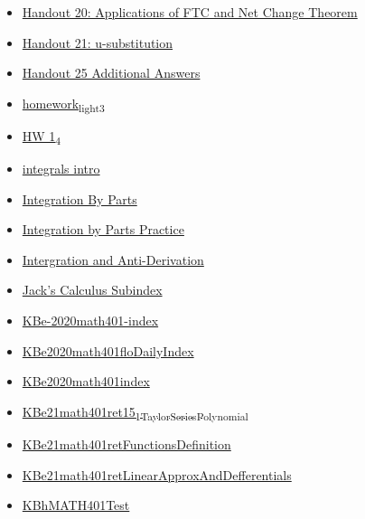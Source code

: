 \documentclass[11pt]{article}
\begin{document}
\begin{itemize}
\begin{itemize}
\begin{itemize}
\item \href{mathematics/single\_variable\_calculus/KBe21math401retHandout20.org}{Handout 20: Applications of FTC and Net Change Theorem}
\item \href{mathematics/single\_variable\_calculus/KBe21math401retHandout21uSubstitution.org}{Handout 21: u-substitution}
\item \href{mathematics/single\_variable\_calculus/KBe21math401retHandout25AreaBetweenCurves.org}{Handout 25 Additional Answers}
\item \href{mathematics/single\_variable\_calculus/KB20200916215836.org}{homework\textsubscript{light}\textsubscript{3}}
\item \href{mathematics/single\_variable\_calculus/KBe20math401ret1\_4.org}{HW 1\textsubscript{4}}
\item \href{mathematics/single\_variable\_calculus/KBe21math401floIntegrals.org}{integrals intro}
\item \href{mathematics/single\_variable\_calculus/KBe21math401retHandout23IntegrationByParts.org}{Integration By Parts}
\item \href{mathematics/single\_variable\_calculus/KBe21math401floIntegrationByPartsPractice.org}{Integration by Parts Practice}
\item \href{mathematics/single\_variable\_calculus/KBhMATH401Intergrals.org}{Intergration and Anti-Derivation}
\item \href{mathematics/single\_variable\_calculus/KBhMATH401SubIndex.org}{Jack's Calculus Subindex}
\item \href{mathematics/single\_variable\_calculus/KBe-2020math401-index.org}{KBe-2020math401-index}
\item \href{mathematics/single\_variable\_calculus/KBe2020math401floDailyIndex.org}{KBe2020math401floDailyIndex}
\item \href{mathematics/single\_variable\_calculus/KBe2020math401index.org}{KBe2020math401index}
\item \href{mathematics/single\_variable\_calculus/KBe21math401ret15\_1TaylorSeriesPolynomial.org}{KBe21math401ret15\textsubscript{1TaylorSeriesPolynomial}}
\item \href{mathematics/single\_variable\_calculus/KBe21math401retFunctionsDefinition.org}{KBe21math401retFunctionsDefinition}
\item \href{mathematics/single\_variable\_calculus/KBe21math401retLinearApproxAndDefferentials.org}{KBe21math401retLinearApproxAndDefferentials}
\item \href{mathematics/single\_variable\_calculus/KBhMATH401Test.org}{KBhMATH401Test}

\end{itemize}
\end{itemize}
\end{itemize}
\end{document}
